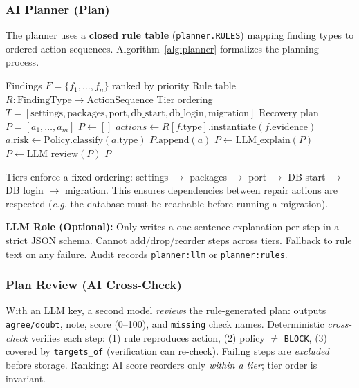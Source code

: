 \documentclass[conference,10pt,caption=false]{IEEEtran}
\newcommand{\eg}{\textit{e.g.}\xspace}
\begin{document}
\subsubsection{AI Planner (Plan)}
\label{sec:planner}
The planner uses a \textbf{closed rule table} (\texttt{planner.RULES}) mapping finding types to ordered action sequences. Algorithm~\ref{alg:planner} formalizes the planning process.

\begin{algorithm}[t]
\caption{Deterministic Recovery Planning}
\label{alg:planner}
\small
\begin{algorithmic}[1]
\Require Findings $F = \{f_1, \ldots, f_n\}$ ranked by priority
\Require Rule table $R: \text{FindingType} \to \text{ActionSequence}$
\Require Tier ordering $T = [\text{settings}, \text{packages}, \text{port}, \text{db\_start}, \text{db\_login}, \text{migration}]$
\Ensure Recovery plan $P = [a_1, \ldots, a_m]$
\State $P \gets []$
        \State $actions \gets R[f.\text{type}].\text{instantiate}(f.\text{evidence})$
            \State $a.\text{risk} \gets \text{Policy.classify}(a.\text{type})$
                \State $P.\text{append}(a)$
            \EndIf
        \EndFor
    \EndFor
\EndFor
{}
    \State $P \gets \text{LLM\_explain}(P)$ 
    \State $P \gets \text{LLM\_review}(P)$ 
\EndIf
\State \Return $P$
\end{algorithmic}
\end{algorithm}

Tiers enforce a fixed ordering: settings $\to$ packages $\to$ port $\to$ DB start $\to$ DB login $\to$ migration. This ensures dependencies between repair actions are respected (\eg the database must be reachable before running a migration).

\textbf{LLM Role (Optional):} Only writes a one-sentence explanation per step in a strict JSON schema. Cannot add/drop/reorder steps across tiers. Fallback to rule text on any failure. Audit records \texttt{planner:llm} or \texttt{planner:rules}.

\subsubsection{Plan Review (AI Cross-Check)}
\label{sec:plan-review}
With an LLM key, a second model \textit{reviews} the rule-generated plan: outputs \texttt{agree/doubt}, note, score (0--100), and \texttt{missing} check names. Deterministic \textit{cross-check} verifies each step: (1) rule reproduces action, (2) policy $\neq$ \texttt{BLOCK}, (3) covered by \texttt{targets\_of} (verification can re-check). Failing steps are \textit{excluded} before storage. Ranking: AI score reorders only \textit{within a tier}; tier order is invariant.
\end{document}
